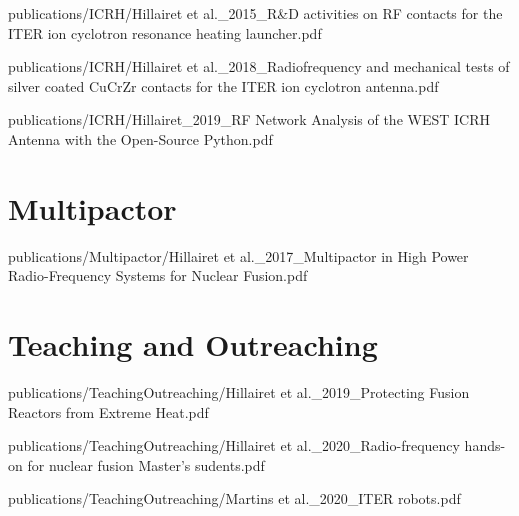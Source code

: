 \documentclass[
fontsize=10pt, %
twoside=true, %
numbers=noenddot, %
]{kaobook}
\begin{document}
			
		{publications/ICRH/Hillairet et al._2015_R&D activities on RF contacts for the ITER ion cyclotron resonance heating launcher.pdf}
		
		
		{publications/ICRH/Hillairet et al._2018_Radiofrequency and mechanical tests of silver coated CuCrZr contacts for the ITER ion cyclotron antenna.pdf}
		
		
		{publications/ICRH/Hillairet_2019_RF Network Analysis of the WEST ICRH Antenna with the Open-Source Python.pdf}
	
	\section{Multipactor}
	
		
		{publications/Multipactor/Hillairet et al._2017_Multipactor in High Power Radio-Frequency Systems for Nuclear Fusion.pdf}
	
	\section{Teaching and Outreaching}
	
			
		{publications/TeachingOutreaching/Hillairet et al._2019_Protecting Fusion Reactors from Extreme Heat.pdf}
		
		
		{publications/TeachingOutreaching/Hillairet et al._2020_Radio-frequency hands-on for nuclear fusion Master's sudents.pdf}
		
			
		{publications/TeachingOutreaching/Martins et al._2020_ITER robots.pdf}
	\fi
	

	
\end{document}
